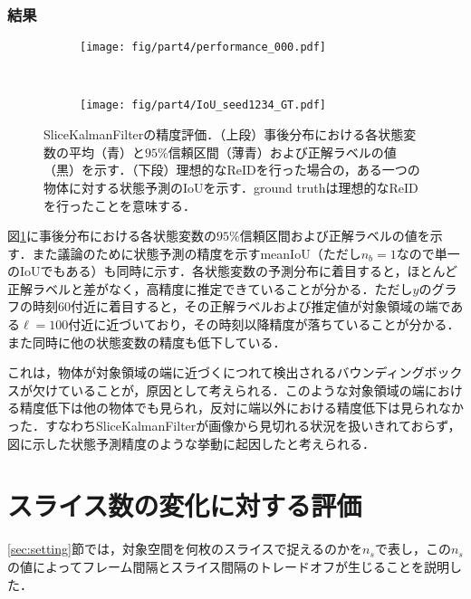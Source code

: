         \subsubsection{結果}

        \begin{figure}[t]
            \begin{subfigure}[t]{\linewidth}
                \centering
                \texttt{[image: fig/part4/performance\_000.pdf]}
            \end{subfigure}
            \\
            \begin{subfigure}[t]{\linewidth}
                \centering
                \texttt{[image: fig/part4/IoU\_seed1234\_GT.pdf]}
            \end{subfigure}
            \caption[SliceKalmanFilterの精度評価]{SliceKalmanFilterの精度評価．（上段）事後分布における各状態変数の平均（青）と$95\%$信頼区間（薄青）および正解ラベルの値（黒）を示す．（下段）理想的なReIDを行った場合の，ある一つの物体に対する状態予測のIoUを示す．ground truthは理想的なReIDを行ったことを意味する．}
            \label{fig:SKF_evaluation}
        \end{figure}

        図\ref{fig:SKF_evaluation}に事後分布における各状態変数の$95\%$信頼区間および正解ラベルの値を示す．また議論のために状態予測の精度を示すmeanIoU（ただし$n_b = 1$なので単一のIoUでもある）も同時に示す．各状態変数の予測分布に着目すると，ほとんど正解ラベルと差がなく，高精度に推定できていることが分かる．ただし$y$のグラフの時刻$60$付近に着目すると，その正解ラベルおよび推定値が対象領域の端である$\ell = 100$付近に近づいており，その時刻以降精度が落ちていることが分かる．また同時に他の状態変数の精度も低下している．

        これは，物体が対象領域の端に近づくにつれて検出されるバウンディングボックスが欠けていることが，原因として考えられる．このような対象領域の端における精度低下は他の物体でも見られ，反対に端以外における精度低下は見られなかった．すなわちSliceKalmanFilterが画像から見切れる状況を扱いきれておらず，図に示した状態予測精度のような挙動に起因したと考えられる．

\section{スライス数の変化に対する評価}
\label{sec:number_of_slice_effect}

\ref{sec:setting}節では，対象空間を何枚のスライスで捉えるのかを$n_s$で表し，この$n_s$の値によってフレーム間隔とスライス間隔のトレードオフが生じることを説明した．

